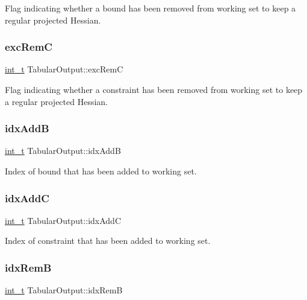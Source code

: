 Flag indicating whether a bound has been removed from working set to keep a regular projected Hessian. \mbox{\label{struct_tabular_output_af8cae5b098eb27a8c040a0e44e56ecbe}} 
\subsubsection{\texorpdfstring{exc\+RemC}{excRemC}}
{\footnotesize\ttfamily \hyperlink{_types_8hpp_ab6fd6105e64ed14a0c9281326f05e623}{int\+\_\+t} Tabular\+Output\+::exc\+RemC}

Flag indicating whether a constraint has been removed from working set to keep a regular projected Hessian. \mbox{\label{struct_tabular_output_a000ee58a740027ffd9a81478da8ad461}} 
\subsubsection{\texorpdfstring{idx\+AddB}{idxAddB}}
{\footnotesize\ttfamily \hyperlink{_types_8hpp_ab6fd6105e64ed14a0c9281326f05e623}{int\+\_\+t} Tabular\+Output\+::idx\+AddB}

Index of bound that has been added to working set. \mbox{\label{struct_tabular_output_ad51b62899fd7e17271106e6909bb246e}} 
\subsubsection{\texorpdfstring{idx\+AddC}{idxAddC}}
{\footnotesize\ttfamily \hyperlink{_types_8hpp_ab6fd6105e64ed14a0c9281326f05e623}{int\+\_\+t} Tabular\+Output\+::idx\+AddC}

Index of constraint that has been added to working set. \mbox{\label{struct_tabular_output_a50fb544a6dda1def00295de035625220}} 
\subsubsection{\texorpdfstring{idx\+RemB}{idxRemB}}
{\footnotesize\ttfamily \hyperlink{_types_8hpp_ab6fd6105e64ed14a0c9281326f05e623}{int\+\_\+t} Tabular\+Output\+::idx\+RemB}

